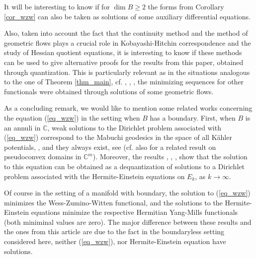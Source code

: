 \documentclass[12pt]{article}
\numberwithin{equation}{section}
\theoremstyle{theorem}
\theoremstyle{definition}
\theoremstyle{remark}
\newcommand{\comp}{\mathbb{C}}
\begin{document}
	\par
	It will be interesting to know if for $\dim B \geq 2$ the forms from Corollary \ref{cor_wzw} can also be taken as solutions of some auxiliary differential equations.
	\par
	Also, taken into account the fact that the continuity method and the method of geometric flows plays a crucial role in Kobayashi-Hitchin correspondence and the study of Hessian quotient equations, it is interesting to know if these methods can be used to give alternative proofs for the results from this paper, obtained through quantization. 
	This is particularly relevant as in the situations analogous to the one of Theorem \ref{thm_main}, cf. \cite{DonLowCalabi}, \cite{XiaCalabi} \cite{HisamCalabi}, \cite{DerSzek}, the minimizing sequences for other functionals were obtained through solutions of some geometric flows.
	\par 
	As a concluding remark, we would like to mention some related works concerning the equation (\ref{eq_wzw}) in the setting when $B$ has a boundary.
	First, when $B$ is an annuli in $\comp$, weak solutions to the Dirichlet problem associated with (\ref{eq_wzw}) correspond to the Mabuchi geodesics in the space of all Kähler potentials, \cite{Semmes} \cite{DonaldSymSp}, and they always exist, see \cite{ChenGeodMab} (cf. also \cite{WuKRWZW} for a related result on pseudoconvex domains in $\comp^m$).
	Moreover, the results \cite{PhongSturm}, \cite{RubinZeld}, \cite{SongZeldToric}, \cite{WuKRWZW} show that the solution to this equation can be obtained as a dequantization of solutions to a Dirichlet problem associated with the Hermite-Einstein equations on $E_k$, as $k \to \infty$.
	\par 
	Of course in the setting of a manifold with boundary, the solution to (\ref{eq_wzw}) minimizes the Wess-Zumino-Witten functional, and the solutions to the Hermite-Einstein equations minimize the respective Hermitian Yang-Mills functionals (both miniminal values are zero).
	The major difference between these results and the ones from this article are due to the fact in the boundaryless setting considered here, neither (\ref{eq_wzw}), nor Hermite-Einstein equation have solutions. 
	

	


		

\Addresses
\end{document}
